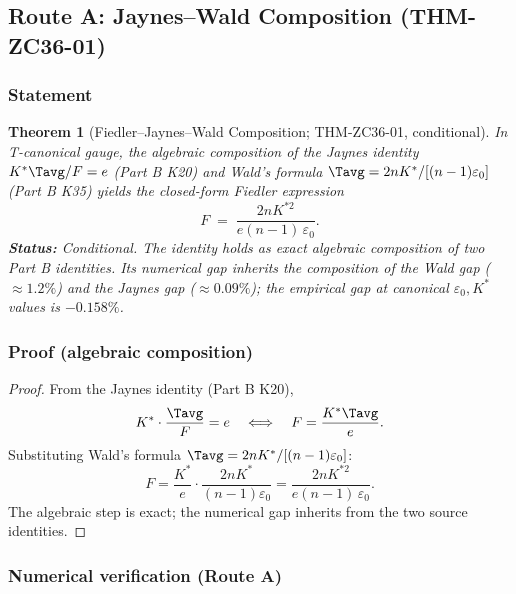 \documentclass[12pt, a4paper]{article}
\newtheorem{theorem}{Theorem}[section]
\begin{document}
\subsection{Route A: Jaynes--Wald Composition (THM-ZC36-01)}
\label{sec:route-a}

\subsubsection{Statement}

\begin{theorem}[Fiedler--Jaynes--Wald Composition;
                THM-ZC36-01, conditional]
\label{thm:zc36-01}
In T-canonical gauge, the algebraic composition of the Jaynes
identity $K^*\Tavg/F = e$ (Part B K20) and Wald's formula
$\Tavg = 2nK^*/[(n-1)\varepsilon_0]$ (Part B K35) yields the
closed-form Fiedler expression
\begin{equation}
  F \;=\; \frac{2 n K^{*2}}{e (n-1)\,\varepsilon_0}.
  \tag{THM-ZC36-01}\label{eq:thm-zc36-01}
\end{equation}
\textbf{Status:} \emph{Conditional}. The identity holds as
exact algebraic composition of two Part B identities. Its
numerical gap inherits the composition of the Wald gap
($\approx 1.2\%$) and the Jaynes gap ($\approx 0.09\%$); the
empirical gap at canonical $\varepsilon_0, K^*$ values is
$-0.158\%$.
\end{theorem}

\subsubsection{Proof (algebraic composition)}

\begin{proof}
From the Jaynes identity (Part B K20),
\[
  K^* \cdot \frac{\Tavg}{F} = e
  \quad\Longleftrightarrow\quad
  F = \frac{K^* \Tavg}{e}.
\]
Substituting Wald's formula
$\Tavg = 2nK^*/[(n-1)\varepsilon_0]$:
\[
  F = \frac{K^*}{e} \cdot \frac{2nK^*}{(n-1)\varepsilon_0}
    = \frac{2 n K^{*2}}{e (n-1)\,\varepsilon_0}.
\]
The algebraic step is exact; the numerical gap inherits from
the two source identities.
\end{proof}

\subsubsection{Numerical verification (Route A)}
\end{document}
